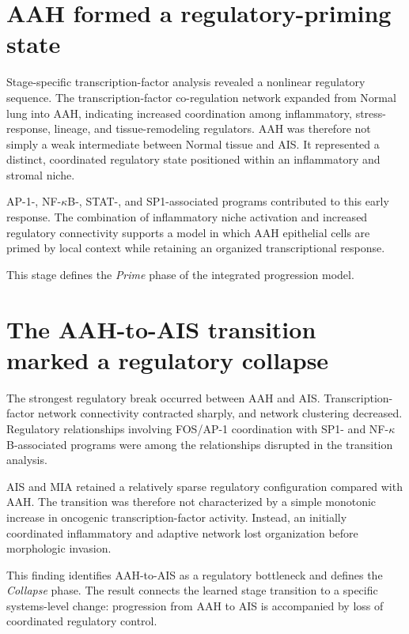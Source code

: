 \section{AAH formed a regulatory-priming state}

Stage-specific transcription-factor analysis revealed a nonlinear regulatory sequence. The transcription-factor co-regulation network expanded from Normal lung into AAH, indicating increased coordination among inflammatory, stress-response, lineage, and tissue-remodeling regulators. AAH was therefore not simply a weak intermediate between Normal tissue and AIS. It represented a distinct, coordinated regulatory state positioned within an inflammatory and stromal niche.

AP-1-, NF-$\kappa$B-, STAT-, and SP1-associated programs contributed to this early response. The combination of inflammatory niche activation and increased regulatory connectivity supports a model in which AAH epithelial cells are primed by local context while retaining an organized transcriptional response.

This stage defines the \emph{Prime} phase of the integrated progression model.


\section{The AAH-to-AIS transition marked a regulatory collapse}

The strongest regulatory break occurred between AAH and AIS. Transcription-factor network connectivity contracted sharply, and network clustering decreased. Regulatory relationships involving FOS/AP-1 coordination with SP1- and NF-$\kappa$B-associated programs were among the relationships disrupted in the transition analysis.

AIS and MIA retained a relatively sparse regulatory configuration compared with AAH. The transition was therefore not characterized by a simple monotonic increase in oncogenic transcription-factor activity. Instead, an initially coordinated inflammatory and adaptive network lost organization before morphologic invasion.

This finding identifies AAH-to-AIS as a regulatory bottleneck and defines the \emph{Collapse} phase. The result connects the learned stage transition to a specific systems-level change: progression from AAH to AIS is accompanied by loss of coordinated regulatory control.

